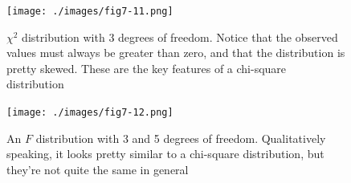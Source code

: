 \documentclass[
  letterpaper,
]{book}
\begin{document}
\begin{figure}

\texttt{[image: ./images/fig7-11.png]} \hfill{}

\caption{\label{fig-fig7-11}\(\chi^2\) distribution with 3 degrees of
freedom. Notice that the observed values must always be greater than
zero, and that the distribution is pretty skewed. These are the key
features of a chi-square distribution}

\end{figure}

\begin{figure}

\texttt{[image: ./images/fig7-12.png]} \hfill{}

\caption{\label{fig-fig7-12}An \(F\) distribution with 3 and 5 degrees
of freedom. Qualitatively speaking, it looks pretty similar to a
chi-square distribution, but they're not quite the same in general}

\end{figure}
\end{document}

